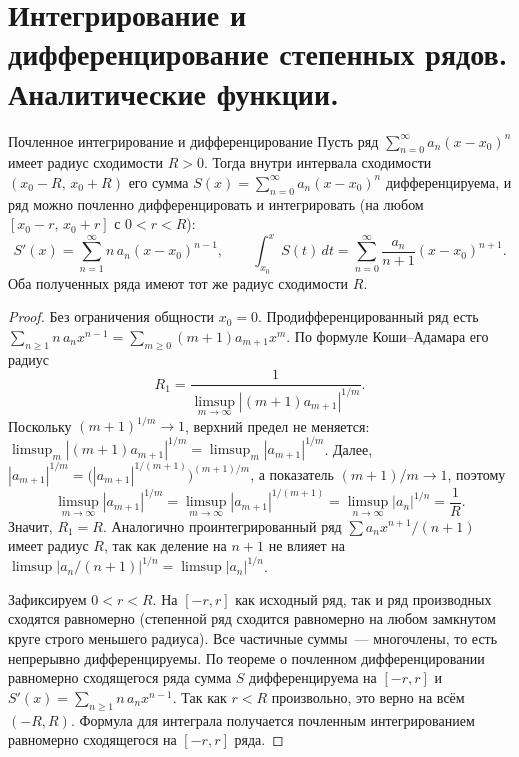 
\section{Интегрирование и дифференцирование степенных рядов. Аналитические функции.}

\begin{Theorem}{Почленное интегрирование и дифференцирование}{}
	Пусть ряд $\sum_{n=0}^{\infty} a_n (x - x_0)^n$ имеет радиус сходимости $R > 0$. Тогда внутри интервала сходимости $(x_0 - R,\, x_0 + R)$ его сумма $S(x) = \sum_{n=0}^{\infty} a_n (x - x_0)^n$ дифференцируема, и ряд можно почленно дифференцировать и интегрировать (на любом $[x_0 - r,\, x_0 + r]$ с $0 < r < R$):
	\[
	S'(x) = \sum_{n=1}^{\infty} n\,a_n (x - x_0)^{n-1}, \qquad
	\int_{x_0}^{x} S(t)\,dt = \sum_{n=0}^{\infty} \frac{a_n}{n + 1} (x - x_0)^{n+1}.
	\]
	Оба полученных ряда имеют тот же радиус сходимости $R$.
\end{Theorem}

\begin{proof}
	Без ограничения общности $x_0 = 0$. Продифференцированный ряд есть $\sum_{n \ge 1} n\,a_n x^{n-1} = \sum_{m \ge 0} (m + 1) a_{m+1} x^m$. По формуле Коши--Адамара его радиус
	\[
	R_1 = \frac{1}{\limsup_{m \to \infty} |(m + 1) a_{m+1}|^{1/m}}.
	\]
	Поскольку $(m + 1)^{1/m} \to 1$, верхний предел не меняется: $\limsup_m |(m+1)a_{m+1}|^{1/m} = \limsup_m |a_{m+1}|^{1/m}$. Далее, $|a_{m+1}|^{1/m} = \bigl(|a_{m+1}|^{1/(m+1)}\bigr)^{(m+1)/m}$, а показатель $(m+1)/m \to 1$, поэтому
	\[
	\limsup_{m \to \infty} |a_{m+1}|^{1/m} = \limsup_{m \to \infty} |a_{m+1}|^{1/(m+1)} = \limsup_{n \to \infty} |a_n|^{1/n} = \frac{1}{R}.
	\]
	Значит, $R_1 = R$. Аналогично проинтегрированный ряд $\sum a_n x^{n+1}/(n+1)$ имеет радиус $R$, так как деление на $n + 1$ не влияет на $\limsup |a_n/(n+1)|^{1/n} = \limsup|a_n|^{1/n}$.

	Зафиксируем $0 < r < R$. На $[-r, r]$ как исходный ряд, так и ряд производных сходятся равномерно (степенной ряд сходится равномерно на любом замкнутом круге строго меньшего радиуса). Все частичные суммы~--- многочлены, то есть непрерывно дифференцируемы. По теореме о почленном дифференцировании равномерно сходящегося ряда сумма $S$ дифференцируема на $[-r, r]$ и $S'(x) = \sum_{n \ge 1} n\,a_n x^{n-1}$. Так как $r < R$ произвольно, это верно на всём $(-R, R)$. Формула для интеграла получается почленным интегрированием равномерно сходящегося на $[-r, r]$ ряда. %
\end{proof}

